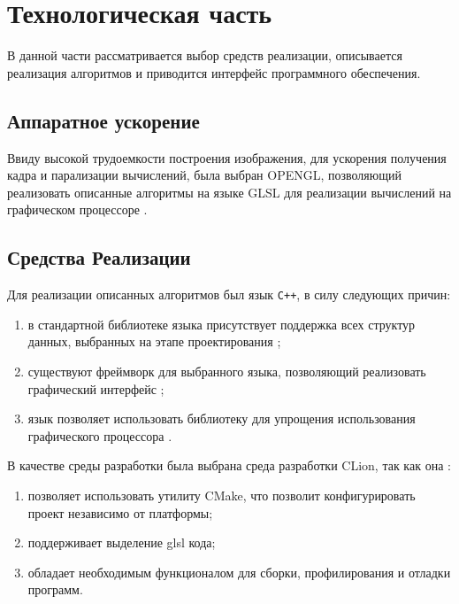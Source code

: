 \chapter{Технологическая часть}
В данной части рассматривается выбор средств реализации, описывается реализация алгоритмов и приводится интерфейс программного
обеспечения.

\section{Аппаратное ускорение}
Ввиду высокой трудоемкости построения изображения, для ускорения получения кадра и
парализации вычислений, была выбран OPENGL, позволяющий реализовать описанные алгоритмы на языке GLSL для реализации вычислений на графическом процессоре \cite{ray_trace_glsl}.

\section{Средства Реализации}
Для реализации описанных алгоритмов был язык \texttt{C++}, в силу следующих причин:
\begin{enumerate}
	\item в стандартной библиотеке языка присутствует поддержка всех структур данных,
	выбранных на этапе проектирования \cite{STL};
	\item существуют фреймворк для выбранного языка, позволяющий реализовать графический интерфейс \cite{qt_c++};
	\item язык позволяет использовать библиотеку для упрощения использования графического процессора \cite{qt_opengl}.
\end{enumerate}

В качестве среды разработки была выбрана среда разработки  CLion, так как она \cite{clion}:
\begin{enumerate}
    \item позволяет использовать утилиту CMake, что позволит конфигурировать проект независимо от платформы;
    \item поддерживает выделение glsl кода;
    \item обладает необходимым функционалом для сборки, профилирования и отладки программ.
\end{enumerate}


